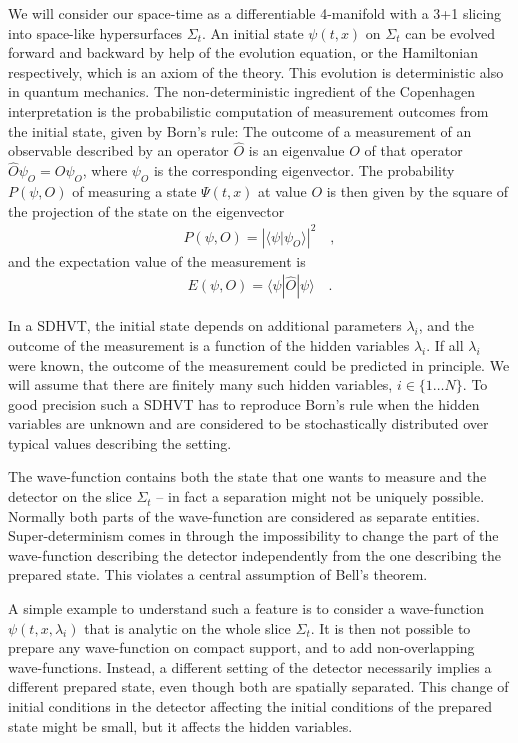 \documentclass[12pt]{article}                    %
\newcommand{\beqn}{\begin{eqnarray}}
\newcommand{\eeqn}{\end{eqnarray}}
\begin{document}
We will consider our space-time as a differentiable 4-manifold with a
3+1 slicing into space-like hypersurfaces $\Sigma_t$. An initial state
$\psi(t,x)$ on $\Sigma_t$ can be evolved forward and backward by help
of the evolution equation, or the Hamiltonian respectively, which is
an axiom of the theory. This evolution
is deterministic also in quantum mechanics. The non-deterministic ingredient of
the Copenhagen interpretation
is the probabilistic computation of measurement outcomes from the initial 
state, given by Born's rule: The outcome of a measurement of an
observable described by an operator $\hat O$ is an eigenvalue $O$ of that
operator $\hat O \psi_O = O \psi_O$, where $\psi_O$ is the corresponding
eigenvector. The probability $P(\psi, O)$ of measuring a 
state $\Psi(t,x)$ at value $O$ is then given by the square of the projection of the
state on the eigenvector
\beqn
P(\psi, O) = \left| \langle \psi | \psi_O \rangle \right|^2 \quad,
\eeqn
and the expectation value of the measurement is
\beqn
E(\psi, O) = \langle \psi \left| \hat O \right| \psi \rangle \quad.
\eeqn

In a {\sc SDHVT}, the initial state depends 
on additional parameters $\lambda_i$, and the outcome of the measurement is a function of the
hidden variables $\lambda_i$. If all $\lambda_i$ were known, the outcome
of the measurement could be predicted in principle. We will assume that there are finitely
many such hidden variables, $i \in \{1\dots N\}$. To good precision such a {\sc SDHVT} has to
reproduce Born's rule when the hidden variables are unknown and are
considered to be stochastically distributed over typical values describing the setting. 

The wave-function contains both the state that one wants
to measure and the detector on the slice $\Sigma_t$ -- in fact a separation
might not be uniquely possible. Normally both parts of the wave-function
are considered as separate entities. Super-determinism comes
in through the impossibility to change the part of the wave-function 
describing the detector independently from the one describing the prepared
state. This violates a central assumption of Bell's theorem. 

A simple example 
to understand such a feature is to 
consider a wave-function $\psi(t, x, \lambda_i)$ that is analytic on the whole slice $\Sigma_t$. It is
then not possible to prepare any wave-function on compact support, and to add non-overlapping
wave-functions. Instead, a different
setting of the detector necessarily implies a different prepared state, even though
both are spatially separated.
This change of initial conditions in the detector affecting the initial
conditions of the prepared state might be small, but it affects 
the hidden variables. 
\end{document}
